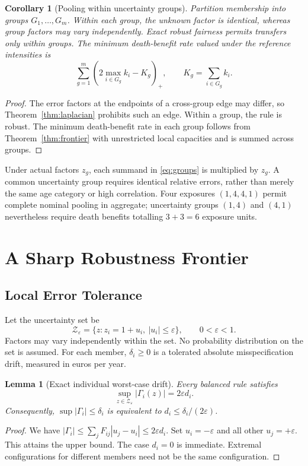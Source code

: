 \documentclass[11pt,a4paper]{article}
\newtheorem{lemma}[theorem]{Lemma}
\newtheorem{corollary}[theorem]{Corollary}
\theoremstyle{definition}\newtheorem{definition}[theorem]{Definition}
\theoremstyle{remark}\newtheorem{remark}[theorem]{Remark}
\newcommand{\pos}[1]{\left(#1\right)_+}
\begin{document}
\begin{corollary}[Pooling within uncertainty groups]\label{cor:groups}
Partition membership into groups $G_1,\ldots,G_m$. Within each group, the unknown factor is identical, whereas group factors may vary independently. Exact robust fairness permits transfers only within groups. The minimum death-benefit rate valued under the reference intensities is
\begin{equation}\label{eq:groups}
\sum_{g=1}^m\pos{2\max_{i\in G_g}k_i-K_g},
\qquad K_g=\sum_{i\in G_g}k_i.
\end{equation}
\end{corollary}
\begin{proof}
The error factors at the endpoints of a cross-group edge may differ, so Theorem~\ref{thm:laplacian} prohibits such an edge. Within a group, the rule is robust. The minimum death-benefit rate in each group follows from Theorem~\ref{thm:frontier} with unrestricted local capacities and is summed across groups.
\end{proof}
Under actual factors $z_g$, each summand in \eqref{eq:groups} is multiplied by $z_g$. A common uncertainty group requires identical relative errors, rather than merely the same age category or high correlation. Four exposures $(1,4,4,1)$ permit complete nominal pooling in aggregate; uncertainty groups $(1,4)$ and $(4,1)$ nevertheless require death benefits totalling $3+3=6$ exposure units.

\section{A Sharp Robustness Frontier}\label{sec:frontier}
\subsection{Local Error Tolerance}
Let the uncertainty set be
\[
\mathcal Z_\varepsilon=\{z:z_i=1+u_i,\ |u_i|\le\varepsilon\},
\qquad 0<\varepsilon<1.
\]
Factors may vary independently within the set. No probability distribution on the set is assumed. For each member, $\delta_i\ge0$ is a tolerated absolute misspecification drift, measured in euros per year.

\begin{lemma}[Exact individual worst-case drift]\label{lem:worst}
Every balanced rule satisfies
\begin{equation}\label{eq:worst}
\sup_{z\in\mathcal Z_\varepsilon}|\Gamma_i(z)|=2\varepsilon d_i.
\end{equation}
Consequently, $\sup|\Gamma_i|\le\delta_i$ is equivalent to $d_i\le\delta_i/(2\varepsilon)$.
\end{lemma}
\begin{proof}
We have $|\Gamma_i|\le\sum_jF_{ij}|u_j-u_i|\le2\varepsilon d_i$. Set $u_i=-\varepsilon$ and all other $u_j=+\varepsilon$. This attains the upper bound. The case $d_i=0$ is immediate. Extremal configurations for different members need not be the same configuration.
\end{proof}
\end{document}
